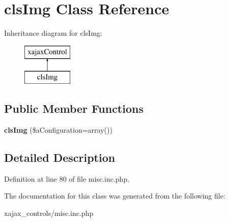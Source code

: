 \hypertarget{classclsImg}{
\section{clsImg Class Reference}
\label{classclsImg}
}
Inheritance diagram for clsImg:\begin{figure}[H]
\begin{center}
\leavevmode
\includegraphics[height=2.000000cm]{classclsImg}
\end{center}
\end{figure}
\subsection*{Public Member Functions}
\begin{DoxyCompactItemize}
\item 
\hypertarget{classclsImg_aa6f61765d5effce995b6310fe226b037}{
{\bfseries clsImg} (\$aConfiguration=array())}
\label{classclsImg_aa6f61765d5effce995b6310fe226b037}

\end{DoxyCompactItemize}


\subsection{Detailed Description}


Definition at line 80 of file misc.inc.php.



The documentation for this class was generated from the following file:\begin{DoxyCompactItemize}
\item 
xajax\_\-controls/misc.inc.php\end{DoxyCompactItemize}
